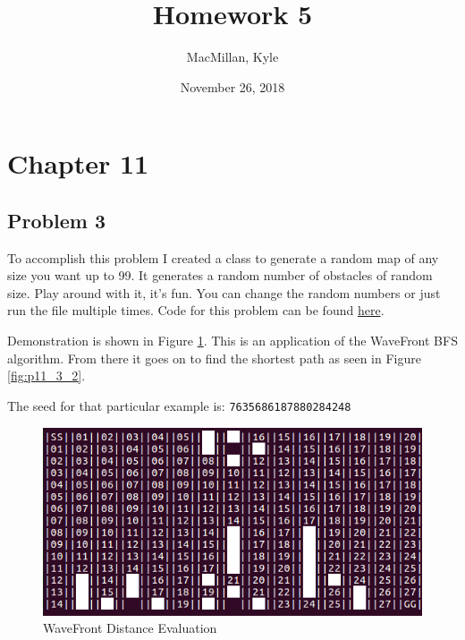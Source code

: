 \documentclass{article}
\title{\textbf{Homework 5}}
\author{MacMillan, Kyle}
\date{November 26, 2018}
\begin{document}
\maketitle

\newpage
\tableofcontents
{}
\newpage
\listoffigures
{}



\newpage
\hypersetup{
    colorlinks,
    citecolor=blue,
    filecolor=black,
    linkcolor=blue,
    urlcolor=blue
}

\setcounter{page}{1}
\newpage
\section{\textbf{Chapter 11}}
\subsection{Problem 3}
To accomplish this problem I created a class to generate a random map of any 
size you want up to 99. It generates a random number of obstacles of random 
size. Play around with it, it's fun. You can change the random numbers or just 
run the file multiple times. Code for this problem can be found 
\href{https://github.com/macattackftw/RoboticsHW/blob/master/HW5/problem11_3.py}{here}.

Demonstration is shown in Figure \ref{fig:p11_3_1}. This is an application of 
the WaveFront BFS algorithm. From there it goes on to find the shortest path as 
seen in Figure \ref{fig:p11_3_2}.

The seed for that particular example is: \texttt{7635686187880284248}

\begin{figure}[h]
    \centering
    \includegraphics[scale=2.5]{problem11_3_1}
    \caption{WaveFront Distance Evaluation}
    \label{fig:p11_3_1}
\end{figure}
\end{document}
